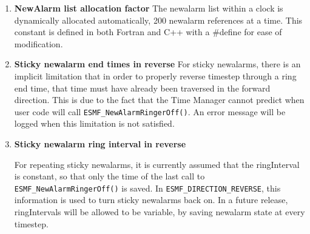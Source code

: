 
\begin{enumerate}

\item {\bf NewAlarm list allocation factor}  The newalarm list within a clock is
dynamically allocated automatically, 200 newalarm references at a time.
This constant is defined in both Fortran and C++ with a \#define for ease
of modification.

\item {\bf Sticky newalarm end times in reverse}  For sticky newalarms, there is
an implicit limitation that in order to properly reverse timestep through a
ring end time, that time must have already been traversed in the forward
direction.  This is due to the fact that the Time Manager cannot predict
when user code will call {\tt ESMF\_NewAlarmRingerOff()}.  An error message
will be logged when this limitation is not satisfied.

\item {\bf Sticky newalarm ring interval in reverse}  
\begin{sloppypar}
For repeating sticky newalarms,
it is currently assumed that the ringInterval is constant, so that only the
time of the last call to {\tt ESMF\_NewAlarmRingerOff()} is saved.  In
{\tt ESMF\_DIRECTION\_REVERSE}, this information is used to turn sticky newalarms
back on.  In a future release, ringIntervals will be allowed to be variable,
by saving newalarm state at every timestep.
\end{sloppypar}

\end{enumerate}
